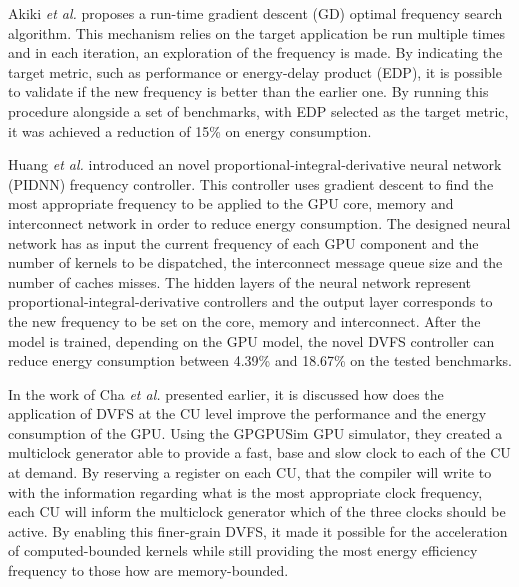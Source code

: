 Akiki \textit{et al.} \cite{akiki_energy-aware_2018} proposes a run-time gradient descent (GD) optimal frequency search algorithm. This mechanism relies on the target application be run multiple times and in each iteration, an exploration of the frequency is made. By indicating the target metric, such as performance or energy-delay product (EDP), it is possible to validate if the new frequency is better than the earlier one. By running this procedure alongside a set of benchmarks, with EDP selected as the target metric, it was achieved a reduction of 15\% on energy consumption.

Huang \textit{et al.} \cite{huang_gpu_2019} introduced an novel proportional-integral-derivative neural network (PIDNN) frequency controller. This controller uses gradient descent to find the most appropriate frequency to be applied to the GPU core, memory and interconnect network in order to reduce energy consumption. The designed neural network has as input the current frequency of each GPU component and the number of kernels to be dispatched, the interconnect message queue size and the number of caches misses. The hidden layers of the neural network represent proportional-integral-derivative controllers and the output layer corresponds to the new frequency to be set on the core, memory and interconnect. After the model is trained, depending on the GPU model, the novel DVFS controller can reduce energy consumption between 4.39\% and 18.67\% on the tested benchmarks.

In the work of Cha \textit{et al.} \cite{cha_core-level_2018} presented earlier, it is discussed how does the application of DVFS at the CU level improve the performance and the energy consumption of the GPU. Using the GPGPUSim GPU simulator, they created a multiclock generator able to provide a fast, base and slow clock to each of the CU at demand.  By reserving a register on each CU, that the compiler will write to with the information regarding what is the most appropriate clock frequency, each CU will inform the multiclock generator which of the three clocks should be active. By enabling this finer-grain DVFS, it made it possible for the acceleration of computed-bounded kernels while still providing the most energy efficiency frequency to those how are memory-bounded.





